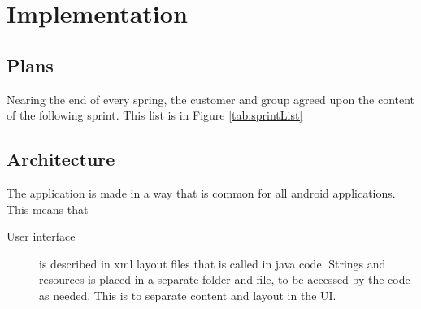 \chapter{Implementation}
\section{Plans}


Nearing the end of every spring, the customer and group agreed upon the content of the following sprint. This list is in Figure \ref{tab:sprintList}





\section{Architecture}
The application is made in a way that is common for all android applications. This means that
\begin{description}
\item[User interface] is described in xml layout files that is called in java code. Strings and resources is placed in a separate folder and file, to be accessed by the code as needed. This is to separate content and layout in the UI.
\end{description}





 





